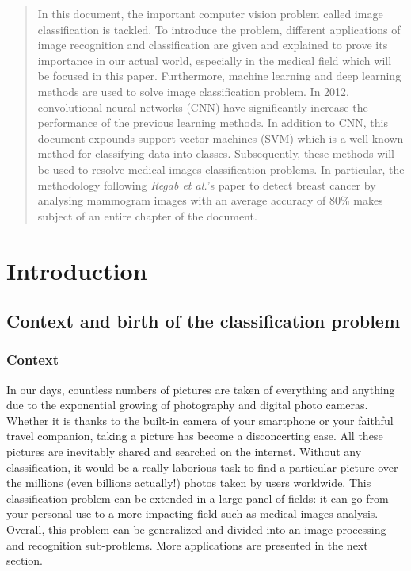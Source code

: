 \documentclass[11pt, openany]{report}
\theoremstyle{plain}
\theoremstyle{definition}
\theoremstyle{remark}
\begin{document}
\begin{abstract}

In this document, the important computer vision problem called image classification is tackled. To introduce the problem, different applications of image recognition and classification are given and explained to prove its importance in our actual world,  especially in the medical field which will be focused in this paper. Furthermore, machine learning and deep learning methods are used to solve image classification problem. In 2012, convolutional neural networks (CNN) have significantly increase the performance of the previous learning methods. In addition to CNN, this document expounds support vector machines (SVM) which is a well-known method for classifying data into classes. Subsequently, these methods will be used to resolve medical images classification problems. In particular, the methodology following \textit{Regab et al.}'s paper \cite{breast-cancer} to detect breast cancer by analysing mammogram images with an average accuracy of 80\%  makes subject of an entire chapter of the document.      

\end{abstract}

\tableofcontents


\chapter{Introduction}

\section{Context and birth of the classification problem}

\subsection{Context}

In our days, countless numbers of pictures are taken of everything and anything due to the exponential growing of photography and digital photo cameras. Whether it is thanks to the built-in camera of your smartphone or your faithful travel companion, taking a picture has become a disconcerting ease. All these pictures are inevitably shared and searched on the internet. Without any classification, it would be a really laborious task to find a particular picture over the millions (even billions actually!) photos taken by users worldwide. This classification problem can be extended in a large panel of fields: it can go from your personal use to a more impacting field such as medical images analysis. Overall, this problem can be generalized and divided into an image processing and recognition sub-problems. More applications are presented in the next section.  \\
\end{document}
